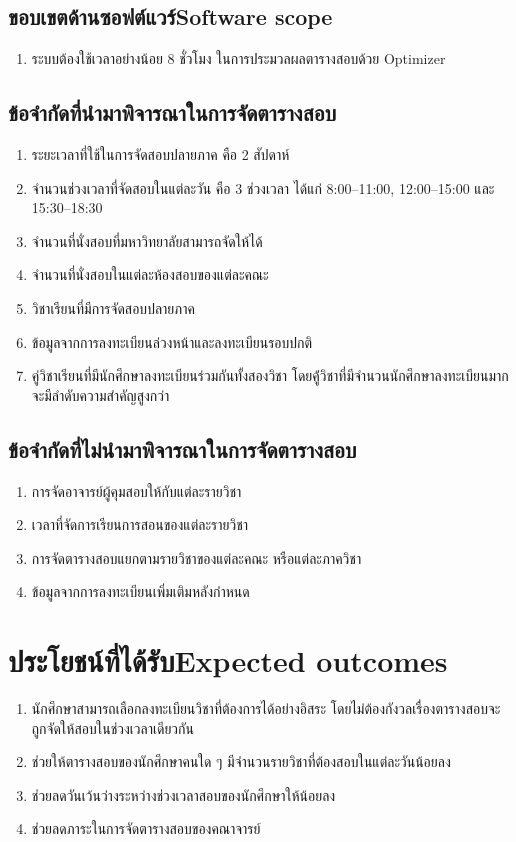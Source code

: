 \subsection{\ifcpe ขอบเขตด้านซอฟต์แวร์\else Software scope\fi}
\begin{enumerate}
    \item ระบบต้องใช้เวลาอย่างน้อย 8 ชั่วโมง ในการประมวลผลตารางสอบด้วย Optimizer
\end{enumerate}
\subsection{ข้อจำกัดที่นำมาพิจารณาในการจัดตารางสอบ}
\begin{enumerate}
    \item ระยะเวลาที่ใช้ในการจัดสอบปลายภาค คือ 2 สัปดาห์
    \item จำนวนช่วงเวลาที่จัดสอบในแต่ละวัน คือ 3 ช่วงเวลา ได้แก่ 8:00--11:00, 12:00--15:00 
    และ 15:30--18:30
    \item จำนวนที่นั่งสอบที่มหาวิทยาลัยสามารถจัดให้ได้
    \item จำนวนที่นั่งสอบในแต่ละห้องสอบของแต่ละคณะ
    \item วิชาเรียนที่มีการจัดสอบปลายภาค
    \item ข้อมูลจากการลงทะเบียนล่วงหน้าและลงทะเบียนรอบปกติ
    \item คู่วิชาเรียนที่มีนักศึกษาลงทะเบียนร่วมกันทั้งสองวิชา โดยคู้่วิชาที่มีจำนวนนักศึกษาลงทะเบียนมาก จะมีลำดับความสำคัญสูงกว่า
\end{enumerate}

\subsection{ข้อจำกัดที่ไม่นำมาพิจารณาในการจัดตารางสอบ}
\begin{enumerate}
    \item การจัดอาจารย์ผู้คุมสอบให้กับแต่ละรายวิชา
    \item เวลาที่จัดการเรียนการสอนของแต่ละรายวิชา
    \item การจัดตารางสอบแยกตามรายวิชาของแต่ละคณะ หรือแต่ละภาควิชา
    \item ข้อมูลจากการลงทะเบียนเพิ่มเติมหลังกำหนด
\end{enumerate}

\section{\ifcpe ประโยชน์ที่ได้รับ\else Expected outcomes\fi}
\begin{enumerate}
    \item นักศึกษาสามารถเลือกลงทะเบียนวิชาที่ต้องการได้อย่างอิสระ โดยไม่ต้องกังวลเรื่องตารางสอบจะถูกจัดให้สอบในช่วงเวลาเดียวกัน
    \item ช่วยให้ตารางสอบของนักศึกษาคนใด ๆ มีจำนวนรายวิชาที่ต้องสอบในแต่ละวันน้อยลง
    \item ช่วยลดวันเว้นว่างระหว่างช่วงเวลาสอบของนักศึกษาให้น้อยลง
    \item ช่วยลดภาระในการจัดตารางสอบของคณาจารย์ 
\end{enumerate}

